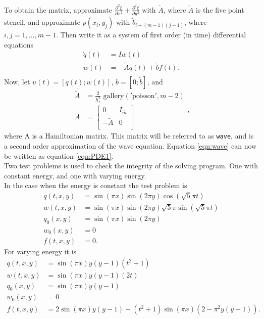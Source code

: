 \noindent To obtain the matrix, approximate $\frac{\partial^2 \xi}{\partial x^2}+ \frac{\partial^2 \xi}{\partial y^2}$ with $\tilde{A}$, where $\tilde{A}$ is the five point stencil\cite{fivepoint}, and approximate $p(x_i,y_j)$ with $\tilde{b}_{i+(m-1)(j-1)}$, where $i,j = 1,\dots,m-1$. Then write it as a system of first order (in time) differential equations
\begin{equation*}
\begin{aligned}
\dot{q}(t) &= I w(t) \\
\dot{w}(t) & = -\tilde{A} q(t) + \tilde{b} f(t). \\
\end{aligned}
\end{equation*}
Now, let $u(t) = [q(t);w(t)]$, $ b =[0; \tilde{b}] $, and
\begin{equation*}
\begin{aligned}
\tilde{A} &= \frac{2}{h_s^2} \text{ gallery}('\text{poisson}', m-2) \\
A &= 
\begin{bmatrix}
 0 & I_{\hat{m}} \\ - \tilde{A} & 0 \\
\end{bmatrix}
\end{aligned},
\end{equation*}
where A is a Hamiltonian matrix. This matrix will be referred to as \texttt{wave}, and is a second order approximation of the wave equation. Equation \eqref{eqn:wave} can now be written as equation \eqref{eqn:PDE1}. \\

\noindent Two test problems is used to check the integrity of the solving program. One with constant energy, and one with varying energy. \\

\noindent In the case when the energy is constant the test problem is 
\begin{equation*}
\begin{aligned}
q(t,x,y) &= \sin(\pi x) \sin( 2 \pi y) \cos(\sqrt{5} \pi t) \\
w (t,x,y) &= \sin(\pi x) \sin( 2 \pi y) \sqrt{5} \pi \sin(\sqrt{5} \pi t) \\
q_0(x,y) &= \sin( \pi x) \sin(2 \pi y) \\
w_0(x,y) & = 0 \\
f(t,x,y) &= 0 .
\end{aligned}
\end{equation*}
For varying energy it is
\begin{equation*}
\begin{aligned}
q(t,x,y) &= \sin(\pi x) y (y-1) (t^2+1) \\
w(t,x,y) &= \sin(\pi x) y (y-1) (2 t) \\
q_0(x,y) &= \sin(\pi x) y (y-1) \\
w_0(x,y) & = 0 \\
f(t,x,y) & = 2  \sin(\pi x) y (y-1) -(t^2+1) \sin(\pi x) (2-\pi^2 y (y-1)).
\end{aligned}
\end{equation*}

